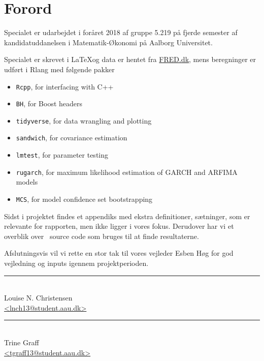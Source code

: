 \chapter{Forord} \label{ch:forord}
Specialet er udarbejdet i foråret 2018 af gruppe 5.219 på fjerde semester af kandidatuddanelsen i Matematik-Økonomi på Aalborg Universitet.

Specialet er skrevet i \LaTeX og data er hentet fra \url{FRED.dk}, mens beregninger er udført i Rlang  med følgende pakker

\begin{itemize}
	\item \texttt{Rcpp}, for interfacing with C++
	\item \texttt{BH}, for Boost headers
	\item \texttt{tidyverse}, for data wrangling and plotting
	\item \texttt{sandwich}, for covariance estimation
	\item \texttt{lmtest}, for parameter testing
	\item \texttt{rugarch}, for maximum likelihood estimation of GARCH and ARFIMA models
	\item \texttt{MCS}, for model confidence set bootstrapping
\end{itemize}

Sidst i projektet findes et appendiks med ekstra definitioner, sætninger, som er relevante for rapporten, men ikke ligger i vores fokus.
Derudover har vi et overblik over \Rlang ~source code som bruges til at finde resultaterne. 

Afslutningsvis vil vi rette en stor tak til vores vejleder Esben Høg for god vejledning og inputs igennem projektperioden.

%
%
\vfill
%

\begin{center}
\begin{minipage}[b]{0.45\textwidth}
 \centering
 \rule{\textwidth}{0.5pt}\\
  Louise N. Christensen\\
 {\footnotesize\ttfamily \href{mailto:lnch13@student.aau.dk}{<lnch13@student.aau.dk>}}
\end{minipage}
\hfill
\begin{minipage}[b]{0.45\textwidth}
 \centering
 \rule{\textwidth}{0.5pt}\\
  Trine Graff\\
 {\footnotesize\ttfamily \href{mailto:tgraff13@student.aau.dk}{<tgraff13@student.aau.dk>}}
\end{minipage}
\end{center}

